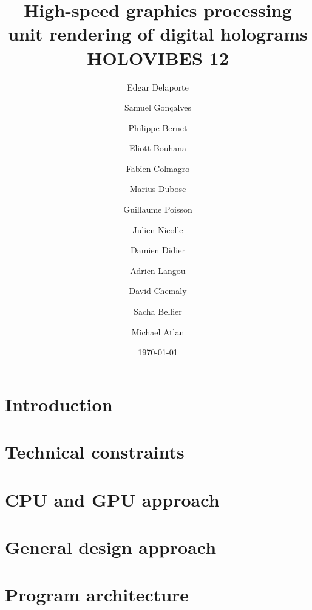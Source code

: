 \documentclass[
 reprint,
 superscriptaddress,
 amsmath,
 amssymb,
 aps,
]{revtex4-2}
\begin{document}
\title{High-speed graphics processing unit rendering of digital holograms\\
\Large HOLOVIBES 12}
\author{Edgar Delaporte}
\author{Samuel Gonçalves}
\author{Philippe Bernet}
\author{Eliott Bouhana}
\author{Fabien Colmagro}
\author{Marius Dubosc}
\author{Guillaume Poisson}
\author{Julien Nicolle}
\author{Damien Didier}
\author{Adrien Langou}
\author{David Chemaly}
\author{Sacha Bellier}
\author{Michael Atlan}

\date{\today}

\begin{abstract}
    
\end{abstract}

\maketitle

\tableofcontents

\newpage

\section{\label{sec:intro} Introduction}


\section{Technical constraints}


\section{CPU and GPU approach}


\section{General design approach}


\section{\label{sec:progarchi}Program architecture}

\end{document}
